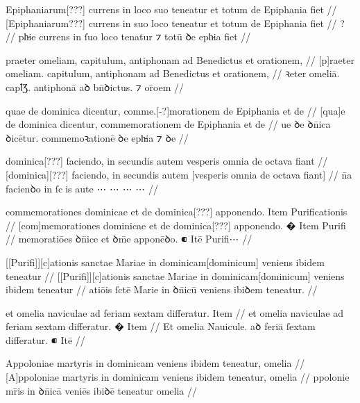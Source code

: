 \ex \bg
\gla
{}
 Epiphaniarum[???] currens in {} loco suo
teneatur et totum de Epiphania fiet
//
\glRekonstrukcja
{}
 [Epiphaniarum???] currens in suo loco {}
teneatur et totum de Epiphania fiet
//
\glUbytki
{?}
//
\glU
{}
ph̵ie currens in ſuo loco tenatur ⁊ totū ꝺe eph̵ia fiet
//
\endgl
\xe



\ex \bg
\gla
{}
praeter omeliam, capitulum, antiphonam ad Benedictus et orationem,
//
\glRekonstrukcja
{}
[p]raeter omeliam. capitulum, antiphonam ad Benedictus et orationem,
//
\glU
{}
ꝛeter omeliā. capꝉƷ. antiphonā aꝺ bn̄ꝺictus. ⁊ or̄oem
//
\endgl
\xe



\ex \bg
\gla
{}
quae de dominica dicentur, comme.[-?]morationem de Epiphania et de
//
\glRekonstrukcja
{}
[qua]e de dominica dicentur, commemorationem de Epiphania et de
//
\glU
{}
ue ꝺe ꝺn̄ica ꝺicētur. commemoꝛationē ꝺe eph̵ia ⁊ ꝺe
//
\endgl
\xe




\ex \bg
\gla
{}
dominica[???] faciendo, in secundis autem
vesperis omnia de octava fiant 
//
\glRekonstrukcja
{}
[dominica][???] faciendo, in secundis autem
[vesperis omnia de octava fiant]
//
\glU
{}
n̄a facienꝺo in ſcis aute ⋯ ⋯ ⋯ ⋯
//
\endgl
\xe



\ex \bg
\gla
{}
commemorationes dominicae et de dominica[???] apponendo.
{} Item Purificationis
//
\glRekonstrukcja
{}
[com]memorationes dominicae et de dominica[???] apponendo.
� Item Purifi
//
\glU
{}
memoratiōes ꝺn̄ice et{} ꝺm̄e apponēꝺo. ⁌ Itē Purifi⋯
//
\endgl
\xe



\ex \bg
\gla
{}
[[Purifi]][c]ationis sanctae Mariae in dominicam[dominicum] veniens ibidem
teneatur
//
\glRekonstrukcja
{}
[[Purifi]][c]ationis sanctae Mariae in dominicam[dominicum] veniens ibidem
teneatur
//
\glU
{}
atiōis ſctē Marie in ꝺn̄icū veniens ibiꝺem teneatur.
//
\endgl
\xe



\ex \bg
\gla
{}
et omelia naviculae ad feriam sextam differatur.
{} Item
//
\glRekonstrukcja
{}
et omelia naviculae ad feriam sextam differatur.
{�} Item
//
\glU
{}
Et omelia Nauicule. aꝺ feriā ſextam diﬀeratur. ⁌ Itē
//
\endgl
\xe



\ex \bg
 \gla
{}
Appoloniae martyris in dominicam  veniens ibidem teneatur,
omelia
//
\glRekonstrukcja
{}
[A]ppoloniae martyris in dominicam  veniens ibidem teneatur,
omelia
//
\glU
{}
ppolonie mr̄is in ꝺn̄icā  veniēs ibiꝺē teneatur omelia
//
\endgl
\xe




